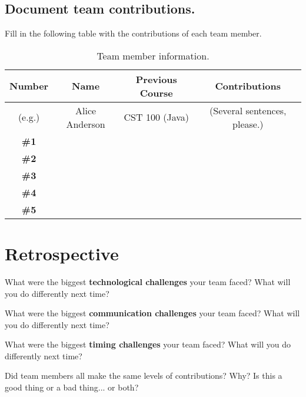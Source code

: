 \documentclass[10pt]{article}
\begin{document}
\pagebreak


\subsection{Document team contributions.}
Fill in the following table with the contributions of each team member.
\begin{table}[htdp]
\caption{Team member information.}
\begin{center}
\begin{tabular}{c c c c}
\hline\hline
Number & Name & Previous Course & Contributions \\ [.5ex]
\hline
(e.g.) & Alice Anderson  & CST 100 (Java) & (Several sentences, please.) \\
\hline
{\bf \#1} & & &  \\ [10ex]
{\bf \#2} & & & \\ [10ex]
{\bf \#3} & & & \\ [10ex]
{\bf \#4} & & & \\ [10ex]
{\bf \#5} & & & \\ [10ex]
\hline
\end{tabular}
\end{center}
\label{table:team}
\end{table}

\pagebreak

\section{Retrospective}

What were the biggest {\bf technological challenges} your team faced? What will you do differently next time?

\vspace{5cm}

What were the biggest {\bf communication challenges} your team faced? What will you do differently next time?

\vspace{5cm}

What were the biggest {\bf timing challenges} your team faced? What will you do differently next time?

\vspace{5cm}

\pagebreak

Did team members all make the same levels of contributions? Why? Is this a good thing or a bad thing... or both?

\vspace{5cm}
\end{document}
